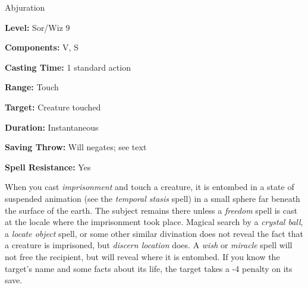 
Abjuration

\textbf{Level:} Sor/Wiz 9

\textbf{Components:} V, S

\textbf{Casting Time:} 1 standard action

\textbf{Range:} Touch

\textbf{Target:} Creature touched

\textbf{Duration:} Instantaneous

\textbf{Saving Throw:} Will negates; see text

\textbf{Spell Resistance:} Yes

When you cast \textit{imprisonment} and touch a creature, it is entombed in a state 
of suspended animation (see the \textit{temporal stasis} spell) in a small sphere 
far beneath the surface of the earth. The subject remains there unless a \textit{freedom 
}spell is cast at the locale where the imprisonment took place. Magical search 
by a \textit{crystal ball}, a \textit{locate object} spell, or some other similar 
divination does not reveal the fact that a creature is imprisoned, but \textit{discern 
location} does. A \textit{wish} or \textit{miracle} spell will not free the recipient, 
but will reveal where it is entombed. If you know the target's name and some facts 
about its life, the target takes a -4 penalty on its save.

